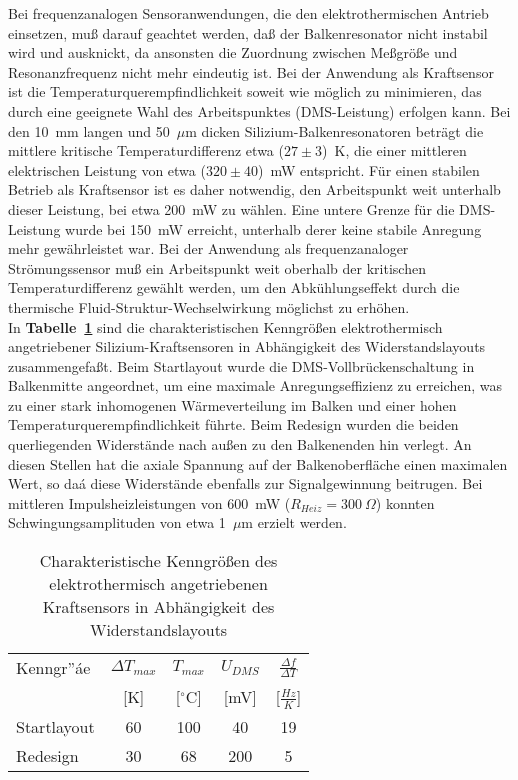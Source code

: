 Bei frequenzanalogen Sensoranwendungen, die den elektrothermischen Antrieb
einsetzen, muß darauf geachtet werden, daß der Balkenresonator
nicht instabil wird und ausknickt, da ansonsten die Zuordnung zwischen
Meßgröße und Resonanzfrequenz nicht mehr eindeutig ist. Bei der Anwendung
als Kraftsensor ist die Temperaturquerempfindlichkeit soweit wie möglich
zu minimieren, das durch eine geeignete Wahl des Arbeitspunktes
(DMS-Leistung) erfolgen
kann. Bei den 10~mm langen und 50~$\mu$m dicken Silizium-Balkenresonatoren
beträgt die mittlere kritische Temperaturdifferenz etwa ($27\pm3$)~K, die
einer mittleren elektrischen Leistung von etwa ($320\pm40$)~mW entspricht.
Für einen stabilen Betrieb als Kraftsensor ist es daher notwendig, den
Arbeitspunkt weit unterhalb dieser Leistung, bei etwa 200~mW zu wählen.
Eine untere Grenze für die DMS-Leistung wurde bei 150~mW erreicht,
unterhalb derer keine stabile Anregung mehr gewährleistet war. Bei der
Anwendung als frequenzanaloger Strömungssensor muß ein Arbeitspunkt
weit oberhalb der kritischen Temperaturdifferenz gewählt werden, um den
Abkühlungseffekt durch die thermische Fluid-Struktur-Wechselwirkung
möglichst zu erhöhen.\\
%
In {\bf Tabelle~\ref{tablayoutredesign}} sind die charakteristischen
Kenngrößen elektrothermisch angetriebener Silizium-Kraftsensoren in
Abhängigkeit des Widerstandslayouts zusammengefaßt.
Beim Startlayout wurde die DMS-Vollbrückenschaltung in Balkenmitte
angeordnet, um eine maximale Anregungseffizienz zu erreichen, was zu
einer stark inhomogenen Wärmeverteilung im Balken und einer
hohen Temperaturquerempfindlichkeit führte. Beim Redesign wurden die
beiden querliegenden Widerstände nach außen zu den Balkenenden hin verlegt.
An diesen Stellen hat die axiale Spannung auf der Balkenoberfläche einen
maximalen Wert, so daá diese Widerstände ebenfalls zur Signalgewinnung
beitrugen. Bei mittleren Impulsheizleistungen von 600~mW
($R_{Heiz}=300~\Omega$) konnten Schwingungsamplituden von etwa 1~$\mu$m
erzielt werden.
\begin{table}[htb]
\begin{center}
\begin{tabular}{|l||c|c|c|c|}
\hline
 Kenngr”áe  & $\Delta T_{max}$ & $T_{max}$   & $U_{DMS}$ & $\frac{\Delta f}{\Delta T}$ \\
            & [K]              & [$^\circ$C] & [mV]      & [$\frac{Hz}{K}$] \\
\hline \hline
 Startlayout & 60 & 100 & 40 & 19 \\
\hline
 Redesign    & 30  & 68 & 200 & 5 \\
\hline
\end{tabular}
\end{center}
\caption{\label{tablayoutredesign}
 Charakteristische Kenngrößen des elektrothermisch angetriebenen
 Kraftsensors in Abhängigkeit des Widerstandslayouts}
\end{table}

